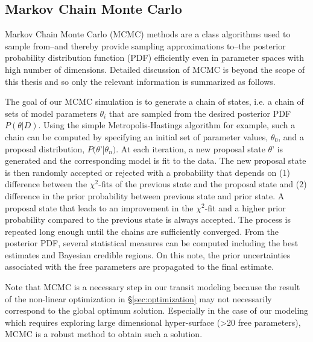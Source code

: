 \subsection{Markov Chain Monte Carlo \label{sec:MCMC}}
Markov Chain Monte Carlo (MCMC) methods are a class algorithms used to sample from--and thereby provide sampling approximations to--the posterior probability distribution function (PDF) efficiently even in parameter spaces with high number of dimensions. Detailed discussion of MCMC is beyond the scope of this thesis and so only the relevant information is summarized as follows.

The goal of our MCMC simulation is to generate a chain of states, i.e. a chain of sets of model parameters $\theta_i$ that are sampled from the desired posterior PDF $P(\theta|D)$. Using the simple Metropolis-Hastings algorithm for example, such a chain can be computed by specifying an initial set of parameter values, $\theta_0$, and a proposal distribution, $P(\theta$'|$\theta_n)$. At each iteration, a new proposal state $\theta$' is generated and the corresponding model is fit to the data. The new proposal state is then randomly accepted or rejected with a probability that depends on (1) difference between the $\chi^2$-fits of the previous state and the proposal state and (2) difference in the prior probability between previous state and prior state. A proposal state that leads to an improvement in the $\chi^2$-fit and a higher prior probability compared to the previous state is always accepted. The process is repeated long enough until the chains are sufficiently converged. From the posterior PDF, several statistical measures can be computed including the best estimates and Bayesian credible regions. On this note, the prior uncertainties associated with the free parameters are propagated to the final estimate.

Note that MCMC is a necessary step in our transit modeling because the result of the non-linear optimization in \S \ref{sec:optimization} may not necessarily correspond to the global optimum solution. Especially in the case of our modeling which requires exploring large dimensional hyper-surface (>20 free parameters), MCMC is a robust method to obtain such a solution.

